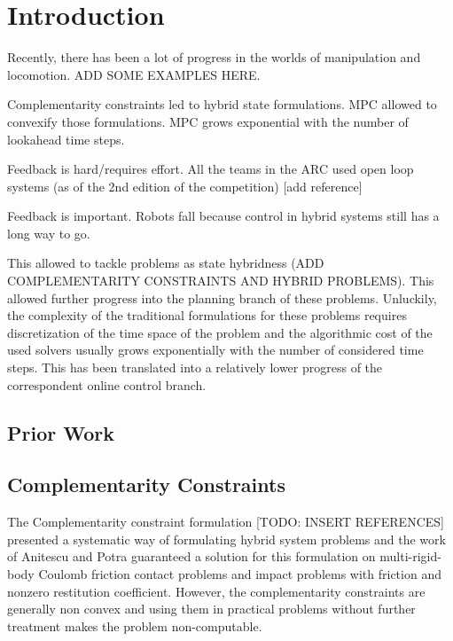 \documentclass[12,twoside]{TFG-GM}
\theoremstyle{definition}
\theoremstyle{remark}
\begin{document}
\maketitle

\section{Introduction}
\label{sec:intro}
Recently, there has been a lot of progress in the worlds of manipulation and locomotion. ADD SOME EXAMPLES HERE.

Complementarity constraints led to hybrid state formulations. MPC allowed to convexify those formulations. MPC grows exponential with the number of  lookahead time steps.

Feedback is hard/requires effort. All the teams in the ARC used open loop systems (as of the 2nd edition of the competition) [add reference]

Feedback is important. Robots fall because control in hybrid systems still has a long way to go.


This allowed to tackle problems as state hybridness (ADD COMPLEMENTARITY CONSTRAINTS AND HYBRID PROBLEMS). This allowed further progress into the planning branch of these problems. Unluckily, the complexity of the traditional formulations for these problems requires discretization of the time space of the problem and the algorithmic cost of the used solvers usually grows exponentially with the number of considered time steps. This has been translated into a relatively lower progress of the correspondent online control branch.

\subsection{Prior Work}
\label{subsec:priorWork}

\subsection{Complementarity Constraints}
\label{subsec:Complementarity Constraint}
The Complementarity constraint formulation [TODO: INSERT REFERENCES] presented a systematic way of formulating hybrid system problems and the work of Anitescu and Potra \cite{lcc1} guaranteed a solution for this formulation on multi-rigid-body Coulomb friction contact problems and impact problems with friction and nonzero restitution coefficient. However, the complementarity constraints are generally non convex and using them in practical problems without further treatment makes the problem non-computable.
\end{document}
